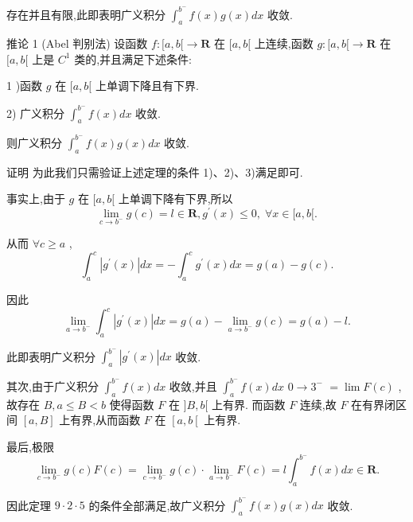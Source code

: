 存在并且有限,此即表明广义积分 ${\int }_{a}^{{b}^{ - }}f\left( x\right) g\left( x\right) {dx}$ 收敛.

推论 1 (Abel 判别法) 设函数 $f : \lbrack a,b\lbrack  \rightarrow  \mathbf{R}$ 在 $\lbrack a,b\lbrack$ 上连续,函数 $g : \lbrack a,b\lbrack  \rightarrow  \mathbf{R}$ 在 $\lbrack a,b\lbrack$ 上是 ${C}^{1}$ 类的,并且满足下述条件:

1 )函数 $g$ 在 $\lbrack a,b\lbrack$ 上单调下降且有下界.

2) 广义积分 ${\int }_{a}^{{b}^{ - }}f\left( x\right) {dx}$ 收敛.

则广义积分 ${\int }_{a}^{{b}^{ - }}f\left( x\right) g\left( x\right) {dx}$ 收敛.

证明 为此我们只需验证上述定理的条件 1)、2)、3)满足即可.

事实上,由于 $g$ 在 $\lbrack a,b\lbrack$ 上单调下降有下界,所以
$$\mathop{\lim }\limits_{{c \rightarrow  {b}^{ - }}}g\left( c\right)  = l \in  \mathbf{R},{g}^{\prime }\left( x\right)  \leq  0,\;\forall x \in  \lbrack a,b\lbrack .$$

从而 $\forall c \geq  a$ ,
$${\int }_{a}^{c}\left| {{g}^{\prime }\left( x\right) }\right| {dx} =  - {\int }_{a}^{c}{g}^{\prime }\left( x\right) {dx} = g\left( a\right)  - g\left( c\right) .$$

因此
$$\mathop{\lim }\limits_{{a \rightarrow  {b}^{ - }}}{\int }_{a}^{c}\left| {{g}^{\prime }\left( x\right) }\right| {dx} = g\left( a\right)  - \mathop{\lim }\limits_{{a \rightarrow  {b}^{ - }}}g\left( c\right)  = g\left( a\right)  - l.$$

此即表明广义积分 ${\int }_{a}^{{b}^{ - }}\left| {{g}^{\prime }\left( x\right) }\right| {dx}$ 收敛.

其次,由于广义积分 ${\int }_{a}^{{b}^{ - }}f\left( x\right) {dx}$ 收敛,并且 ${\int }_{a}^{{b}^{ - }}f\left( x\right) {dx}$  $0 \rightarrow  {3}^{ - }$  $= \lim F\left( c\right)$ ,故存在 $B,a \leq  B < b$ 使得函数 $F$ 在 $\rbrack B,b\lbrack$ 上有界. 而函数 $F$ 连续,故 $F$ 在有界闭区间 $\left\lbrack  {a,B}\right\rbrack$ 上有界,从而函数 $F$ 在 $\left\lbrack  {a,b\left\lbrack  \right. }\right.$ 上有界.

最后,极限
$$\mathop{\lim }\limits_{{c \rightarrow  {b}^{ - }}}g\left( c\right) F\left( c\right)  = \mathop{\lim }\limits_{{c \rightarrow  {b}^{ - }}}g\left( c\right)  \cdot  \mathop{\lim }\limits_{{a \rightarrow  {b}^{ - }}}F\left( c\right)  = l{\int }_{a}^{{b}^{ - }}f\left( x\right) {dx} \in  \mathbf{R}.$$

因此定理 $9 \cdot  2 \cdot  5$ 的条件全部满足,故广义积分 ${\int }_{a}^{{b}^{ - }}f\left( x\right) g\left( x\right) {dx}$ 收敛.

